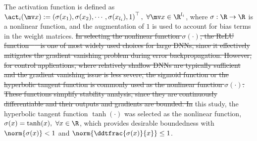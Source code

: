 \documentclass[letterpaper, journal]{IEEEtran}
\newcommand{\ctxt}[2]{\color{#1}#2\color{black}}
\providecommand{\DIFadd}[1]{{\protect\color{blue}\uwave{#1}}} %
\providecommand{\DIFdel}[1]{{\protect\color{red}\sout{#1}}} %
\providecommand{\DIFaddbegin}{} %
\providecommand{\DIFaddend}{} %
\providecommand{\DIFdelbegin}{} %
\providecommand{\DIFdelend}{} %
\begin{document}
The activation function is defined as $\act_i(\mv x):=\left(\sigma(x_1),\sigma(x_2),\cdots, \sigma(x_{l_{i}}), 1\right)^\top,\ \forall\mv x\in\R^{l_i}$, where $\sigma: \R\to\R$ is a nonlinear function, and the augmentation of $1$ is used to account for bias terms in the weight matrices. 
\DIFdelbegin \DIFdel{In selecting the nonlinear function $\sigma(\cdot)$, the ReLU function \mbox{%
\cite{Maas:2013aa} }\hskip0pt%
is one of most widely used choices for large DNNs, since it effectively mitigates the gradient vanishing problem during error backpropagation. 
However, for control applications, where relatively shallow DNNs are typically sufficient and the gradient vanishing issue is less severe, the sigmoid function or the hyperbolic tangent function is commonly used as the nonlinear function $\sigma(\cdot)$. 
These functions simplify stability analysis, since they are continuously differentiable and their outputs and gradients are bounded. 
In }\DIFdelend %
\DIFaddbegin \DIFadd{In }\DIFaddend this study, the hyperbolic tangent function $\tanh(\cdot)$ was selected as the nonlinear function, \ie $\sigma(x) = \tanh(x),\ \forall x\in\R$, which provides desirable boundedness with $\norm{\sigma(x)}<1$ and \DIFdelbegin \DIFdel{$\norm{\ddtfrac{\sigma(x)}{x}}\le 1$}\DIFdelend \DIFaddbegin \DIFadd{$0<\norm{\ddtfrac{\sigma(x)}{x}}\le 1$}\DIFaddend .
\end{document}
